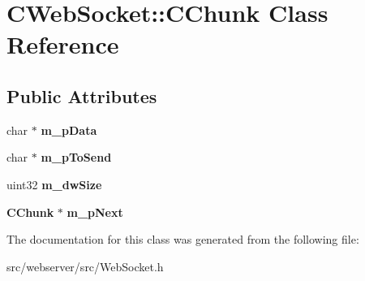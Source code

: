 \section{CWebSocket::CChunk Class Reference}
\label{classCWebSocket_1_1CChunk}
\subsection*{Public Attributes}
\begin{DoxyCompactItemize}
\item 
char $\ast$ {\bfseries m\_\-pData}\label{classCWebSocket_1_1CChunk_ad9d7f8f5d0bb1983bd64faac4f09b62d}

\item 
char $\ast$ {\bfseries m\_\-pToSend}\label{classCWebSocket_1_1CChunk_a0c0d04fba323445cd2731cd28b18eaf3}

\item 
uint32 {\bfseries m\_\-dwSize}\label{classCWebSocket_1_1CChunk_ac4b3959de66eddb418a126e4c5c8ad6a}

\item 
{\bf CChunk} $\ast$ {\bfseries m\_\-pNext}\label{classCWebSocket_1_1CChunk_a52ad670d426d491aae14fceb96642467}

\end{DoxyCompactItemize}


The documentation for this class was generated from the following file:\begin{DoxyCompactItemize}
\item 
src/webserver/src/WebSocket.h\end{DoxyCompactItemize}
